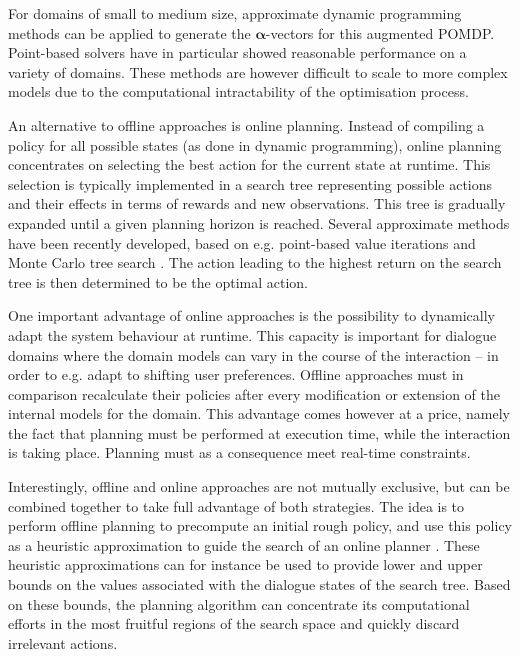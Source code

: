 For domains of small to medium size, approximate dynamic programming methods can be applied to generate the $\boldsymbol\alpha$-vectors for this augmented POMDP.  Point-based solvers \citep{Pineau:2004,Porta:2006} have in particular showed reasonable performance on a variety of domains. These methods are however difficult to scale to more complex models due to the computational intractability of the optimisation process.    

An alternative to offline approaches is online planning.  Instead of compiling a policy for all possible states (as done in dynamic programming), online planning concentrates on selecting the best action for the current state at runtime. This selection is typically implemented in a search tree representing possible actions and their effects in terms of rewards and new observations. This tree is gradually expanded until a given planning horizon is reached.  Several approximate methods have been recently developed, based on e.g. point-based value iterations \citep{ross2008} and Monte Carlo tree search \citep{silver2010uct}. The action leading to the highest return on the search tree is then determined to be the optimal action. 

One important advantage of online approaches is the possibility to dynamically adapt the system behaviour at runtime. This capacity is important for dialogue domains where the domain models can vary in the course of the interaction -- in order to e.g. adapt to shifting user preferences. Offline approaches must in comparison recalculate their policies after every modification or extension of the internal models for the domain.   This advantage comes however at a price, namely the fact that planning must be performed at execution time, while the interaction is taking place.  Planning must as a consequence meet real-time constraints. 

Interestingly, offline and online approaches are not mutually exclusive, but can be combined together to take full advantage of both strategies.  The idea is to perform offline planning to precompute an initial rough policy, and use this policy as a heuristic approximation to guide the search of an online planner \citep{RossC07}. These heuristic approximations can for instance be used to provide lower and upper bounds on the values associated with the dialogue states of the search tree.  Based on these bounds, the planning algorithm can concentrate its computational efforts in the most fruitful regions of the search space and quickly discard irrelevant actions. 

